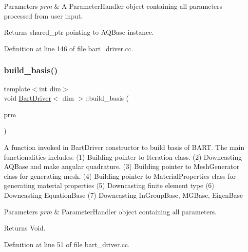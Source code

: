 \begin{DoxyParams}{Parameters}
{\em prm} & A Parameter\+Handler object containing all parameters processed from user input. \\
\hline
\end{DoxyParams}
\begin{DoxyReturn}{Returns}
shared\+\_\+ptr pointing to A\+Q\+Base instance. 
\end{DoxyReturn}


Definition at line 146 of file bart\+\_\+driver.\+cc.

\mbox{\label{class_bart_driver_ade375a4999de1e775434e11d4e6dd935}} 
\subsubsection{\texorpdfstring{build\+\_\+basis()}{build\_basis()}}
{\footnotesize\ttfamily template$<$int dim$>$ \\
void \hyperlink{class_bart_driver}{Bart\+Driver}$<$ dim $>$\+::build\+\_\+basis (\begin{DoxyParamCaption}\item[{Parameter\+Handler \&}]{prm }\end{DoxyParamCaption})\hspace{0.3cm}{\ttfamily [private]}}

A function invoked in Bart\+Driver constructor to build basis of B\+A\+RT. The main functionalities includes\+: (1) Building pointer to Iteration class. (2) Downcasting A\+Q\+Base and make angular quadrature. (3) Building pointer to Mesh\+Generator class for generating mesh. (4) Building pointer to Material\+Properties class for generating material properties (5) Downcasting finite element type (6) Downcasting Equation\+Base (7) Downcasting In\+Group\+Base, M\+G\+Base, Eigen\+Base


\begin{DoxyParams}{Parameters}
{\em prm} & Parameter\+Handler object containing all parameters. \\
\hline
\end{DoxyParams}
\begin{DoxyReturn}{Returns}
Void. 
\end{DoxyReturn}


Definition at line 51 of file bart\+\_\+driver.\+cc.

